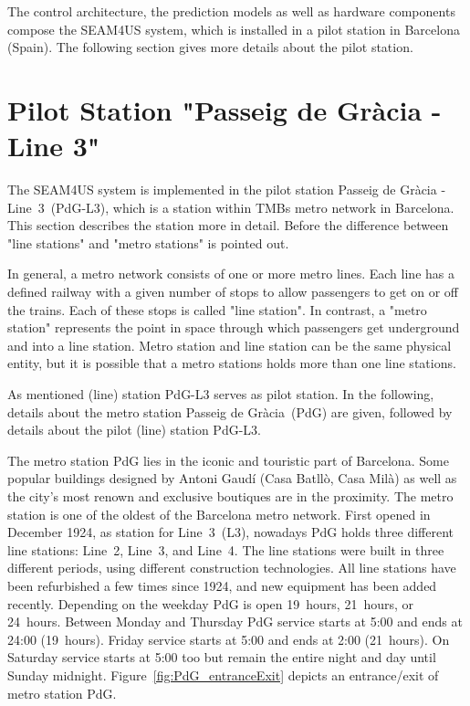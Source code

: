 The control architecture, the prediction models as well as hardware components compose the SEAM4US system, which is installed in a pilot station in Barcelona (Spain). The following section gives more details about the pilot station.


\section{Pilot Station "Passeig de Gr\`{a}cia - Line 3"}
\label{sec:station}


The SEAM4US system is implemented in the pilot station Passeig de Gr\`{a}cia - Line~3~(PdG-L3), which is a station within TMBs metro network in Barcelona. This section describes the station more in detail.
Before the difference between "line stations" and "metro stations" is pointed out.

In general, a metro network consists of one or more metro lines. Each line has a defined railway with a given number of stops to allow passengers to get on or off the trains. Each of these stops is called "line station". In contrast, a "metro station" represents the point in space through which passengers get underground and into a line station. Metro station and line station can be the same physical entity, but it is possible that a metro stations holds more than one line stations.

As mentioned (line) station PdG-L3 serves as pilot station. In the following, details about the metro station Passeig de Gr\`{a}cia~(PdG) are given, followed by details about the pilot (line) station PdG-L3.

The metro station PdG lies in the iconic and touristic part of Barcelona. Some popular buildings designed by Antoni Gaud\'{i} (Casa Batll\`{o}, Casa Mil\`{a}) as well as the city's most renown and exclusive boutiques are in the proximity.
The metro station is one of the oldest of the Barcelona metro network. First opened in December 1924, as station for Line~3~(L3), nowadays PdG holds three different line stations: Line~2, Line~3, and Line~4. The line stations were built in three different periods, using different construction technologies. All line stations have been refurbished a few times since 1924, and new equipment has been added recently.
Depending on the weekday PdG is open 19~hours, 21~hours, or 24~hours. Between Monday and Thursday PdG service starts at 5:00 and ends at 24:00 (19~hours). Friday service starts at 5:00 and ends at 2:00 (21~hours). On Saturday service starts at 5:00 too but remain the entire night and day until Sunday midnight.
Figure~\ref{fig:PdG_entranceExit} depicts an entrance/exit of metro station PdG.

